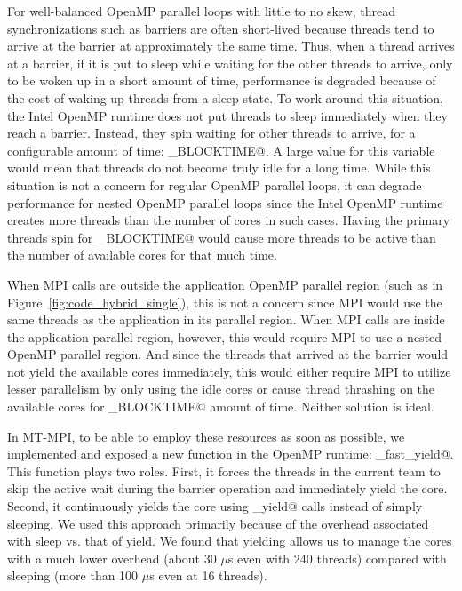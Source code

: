 For well-balanced OpenMP parallel loops with little to no skew, thread
synchronizations such as barriers are often short-lived because
threads tend to arrive at the barrier at approximately the same time.
Thus, when a thread arrives at a barrier, if it is put to sleep while
waiting for the other threads to arrive, only to be woken up in a
short amount of time, performance is degraded because of the cost of
waking up threads from a sleep state.  To work around this situation,
the Intel OpenMP runtime does not put threads to sleep immediately
when they reach a barrier.  Instead, they spin waiting for other
threads to arrive, for a configurable amount of time:
\verb@KMP_BLOCKTIME@.  A large value for this variable would mean that
threads do not become truly idle for a long time.  While this
situation is not a concern for regular OpenMP parallel loops, it can
degrade performance for nested OpenMP parallel loops since the Intel
OpenMP runtime creates more threads than the number of cores in such
cases.  Having the primary threads spin for \verb@KMP_BLOCKTIME@ would
cause more threads to be active than the number of available cores for
that much time.

When MPI calls are outside the application OpenMP parallel region
(such as in Figure~\ref{fig:code_hybrid_single}), this is not a
concern since MPI would use the same threads as the application in its
parallel region.  When MPI calls are inside the application parallel
region, however, this would require MPI to use a nested OpenMP
parallel region.  And since the threads that arrived at the barrier
would not yield the available cores immediately, this would either
require MPI to utilize lesser parallelism by only using the idle cores
or cause thread thrashing on the available cores for
\verb@KMP_BLOCKTIME@ amount of time.  Neither solution is
ideal.

In MT-MPI, to be able to employ these resources as soon as possible,
we implemented and exposed a new function in the OpenMP runtime:
\verb@set_fast_yield@.  This function plays two roles.  First, it
forces the threads in the current team to skip the active wait during
the barrier operation and immediately yield the core.  Second, it
continuously yields the core using \verb@sched_yield@ calls instead of
simply sleeping.  We used this approach primarily because of the
overhead associated with sleep vs. that of yield.  We found that
yielding allows us to manage the cores with a much lower overhead
(about 30 $\mu$s even with 240 threads) compared with sleeping (more
than 100 $\mu$s even at 16 threads).

